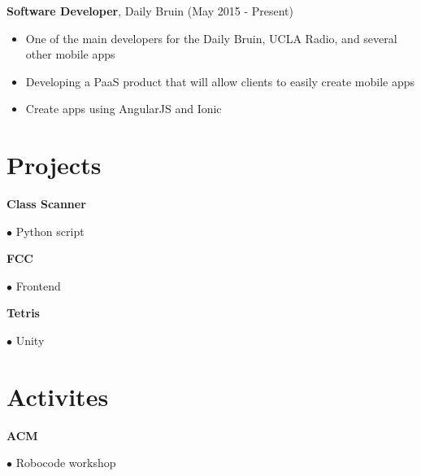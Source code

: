 \documentclass{article}
\begin{document}
    \textbf{Software Developer}, Daily Bruin (May 2015 - Present)
    \begin{itemize}
    \item One of the main developers for the Daily Bruin, UCLA Radio, and several other mobile apps
    \item Developing a PaaS product that will allow clients to easily create mobile apps
    \item Create apps using AngularJS and Ionic
    \end{itemize}


  \section*{Projects}

    \noindent\textbf{Class Scanner}

      $\bullet$ Python script

    \vspace{1ex}

    \noindent\textbf{FCC}

      $\bullet$ Frontend

    \noindent\textbf{Tetris}

      $\bullet$ Unity


  \section*{Activites}

    \noindent\textbf{ACM}

      $\bullet$ Robocode workshop
\end{document}
